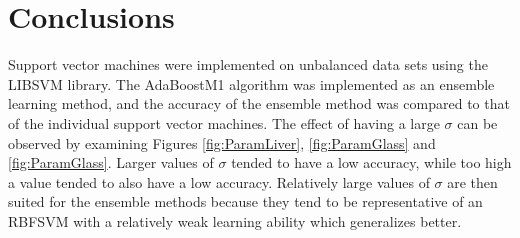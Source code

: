 \section{Conclusions}
\label{sec:Conclusions}

Support vector machines were implemented on unbalanced data sets using the LIBSVM library.
The AdaBoostM1 algorithm was implemented as an ensemble learning method, and the accuracy of the ensemble method was compared to that of the individual support vector machines.
The effect of having a large $\sigma$ can be observed by examining Figures \ref{fig:ParamLiver}, \ref{fig:ParamGlass} and \ref{fig:ParamGlass}.
Larger values of $\sigma$ tended to have a low accuracy, while too high a value tended to also have a low accuracy. 
Relatively large values of $\sigma$ are then suited for the ensemble methods because they tend to be representative of an RBFSVM with a relatively weak learning ability which generalizes better.
